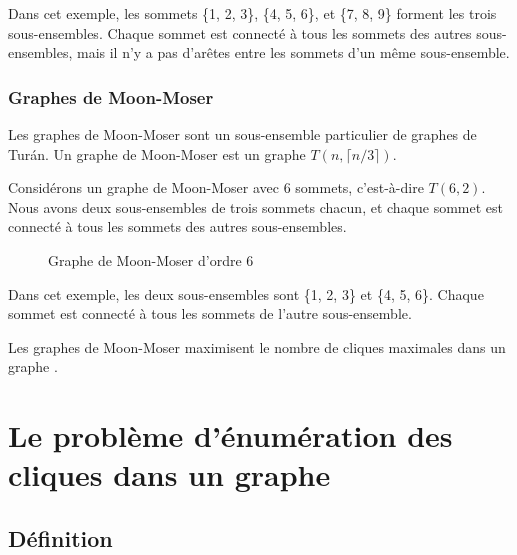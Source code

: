 \documentclass[12pt,a4paper]{article}
\begin{document}
Dans cet exemple, les sommets \{1, 2, 3\}, \{4, 5, 6\}, et \{7, 8, 9\} forment les trois sous-ensembles. Chaque sommet est connecté à tous les sommets des autres sous-ensembles, mais il n'y a pas d'arêtes entre les sommets d'un même sous-ensemble.

\subsubsection*{Graphes de Moon-Moser}
\label{subsubsec:mm}

Les graphes de Moon-Moser sont un sous-ensemble particulier de graphes de Turán. Un graphe de Moon-Moser est un graphe \( T(n, \lceil n/3 \rceil) \).

Considérons un graphe de Moon-Moser avec 6 sommets, c'est-à-dire \( T(6, 2) \). Nous avons deux sous-ensembles de trois sommets chacun, et chaque sommet est connecté à tous les sommets des autres sous-ensembles.

\begin{figure}[h!]
    \centering
    \caption{Graphe de Moon-Moser d'ordre 6}
    \label{fig:moon-moser}
\end{figure}

Dans cet exemple, les deux sous-ensembles sont \{1, 2, 3\} et \{4, 5, 6\}. Chaque sommet est connecté à tous les sommets de l'autre sous-ensemble.

Les graphes de Moon-Moser maximisent le nombre de cliques maximales dans un graphe \cite{MR0182577}.

\section{Le problème d'énumération des cliques dans un graphe}

\subsection{Définition}%
\label{subsec:def_prob}
\end{document}
